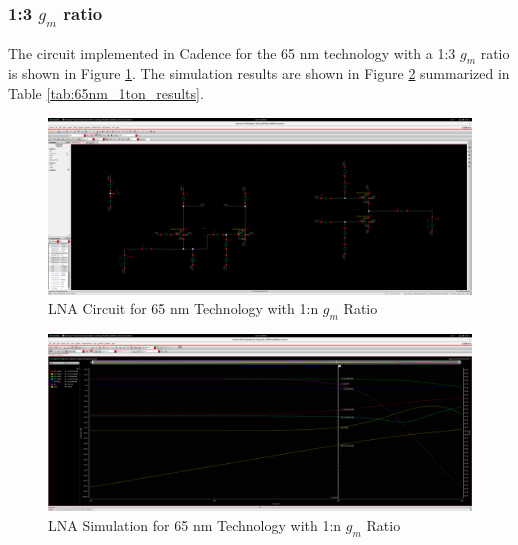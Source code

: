 \subsubsection{1:3 $g_m$ ratio}

The circuit implemented in Cadence for the 65 nm technology with a 1:3 $g_m$ ratio is shown in Figure \ref{fig:65nm_1ton-circ}. The simulation results are shown in Figure \ref{fig:65nm_1ton} summarized in Table \ref{tab:65nm_1ton_results}.

\begin{figure}[H]
    \centering
    \includegraphics[width=1\textwidth]{Images/65nm1To35Circ.png}
    \caption{LNA Circuit for 65 nm Technology with 1:n $g_m$ Ratio}
    \label{fig:65nm_1ton-circ}
\end{figure}

\begin{figure}[H]
    \centering
    \includegraphics[width=1\textwidth]{Images/65nm1To35Final.png}
    \caption{LNA Simulation for 65 nm Technology with 1:n $g_m$ Ratio}
    \label{fig:65nm_1ton}
\end{figure}

